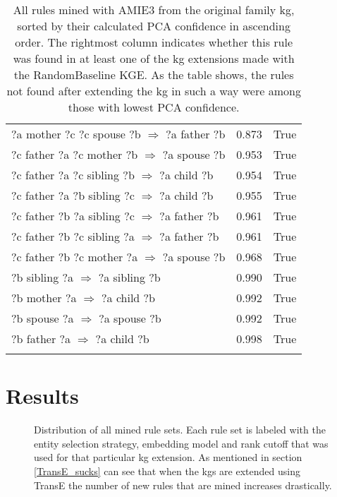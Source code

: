 \begin{longtable}{lrl}
      ?a  mother  ?c  ?c  spouse  ?b   $\Rightarrow$ ?a  father  ?b &           0.873 &                     True \\
      ?c  father  ?a  ?c  mother  ?b   $\Rightarrow$ ?a  spouse  ?b &           0.953 &                     True \\
      ?c  father  ?a  ?c  sibling  ?b   $\Rightarrow$ ?a  child  ?b &           0.954 &                     True \\
      ?c  father  ?a  ?b  sibling  ?c   $\Rightarrow$ ?a  child  ?b &           0.955 &                     True \\
     ?c  father  ?b  ?a  sibling  ?c   $\Rightarrow$ ?a  father  ?b &           0.961 &                     True \\
     ?c  father  ?b  ?c  sibling  ?a   $\Rightarrow$ ?a  father  ?b &           0.961 &                     True \\
      ?c  father  ?b  ?c  mother  ?a   $\Rightarrow$ ?a  spouse  ?b &           0.968 &                     True \\
                    ?b  sibling  ?a   $\Rightarrow$ ?a  sibling  ?b &           0.990 &                     True \\
                       ?b  mother  ?a   $\Rightarrow$ ?a  child  ?b &           0.992 &                     True \\
                      ?b  spouse  ?a   $\Rightarrow$ ?a  spouse  ?b &           0.992 &                     True \\
                       ?b  father  ?a   $\Rightarrow$ ?a  child  ?b &           0.998 &                     True \\
\bottomrule
\caption[Original rules listed family KG]{All rules mined with AMIE3 from the original family \gls{kg}, sorted by their calculated PCA confidence in ascending order. The rightmost column indicates whether this rule was found in at least one of the \gls{kg} extensions made with the RandomBaseline KGE. As the table shows, the rules not found after extending the \gls{kg} in such a way were among those with lowest PCA confidence.}
\label{original_rules_found_by_baseline_family}
\end{longtable}


\chapter{Results}

\begin{figure}[htbp]
\centering
    \centering
    
    \caption[Dist. of all sets of mined rules.]{Distribution of all mined rule sets. Each rule set is labeled with the entity selection strategy, embedding model and rank cutoff that was used for that particular \gls{kg} extension. As mentioned in section \ref{TransE_sucks} can see that when the \glspl{kg} are extended using TransE the number of new rules that are mined increases drastically.}
    \label{all_sets}
\end{figure}


